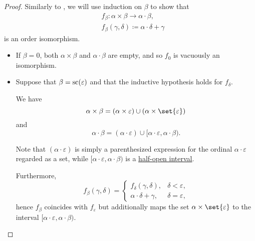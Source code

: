 \begin{proof}
  Similarly to , we will use induction on \( \beta \) to show that
  \begin{equation*}
    \begin{aligned}
      &f_\beta: \alpha \times \beta \to \alpha \cdot \beta, \\
      &f_\beta(\gamma, \delta) \coloneqq \alpha \cdot \delta + \gamma
    \end{aligned}
  \end{equation*}
  is an order isomorphism.

  \begin{itemize}
    \item If \( \beta = 0 \), both \( \alpha \times \beta \) and \( \alpha \cdot \beta \) are empty, and so \( f_0 \) is vacuously an isomorphism.

    \item Suppose that \( \beta = \op{sc}(\varepsilon) \) and that the inductive hypothesis holds for \( f_\delta \).

    We have
    \begin{equation*}
      \alpha \times \beta = (\alpha \times \varepsilon) \cup (\alpha \times \set{ \varepsilon })
    \end{equation*}
    and
    \begin{equation*}
      \alpha \cdot \beta = (\alpha \cdot \varepsilon) \cup [\alpha \cdot \varepsilon, \alpha \cdot \beta).
    \end{equation*}

    Note that \( (\alpha \cdot \varepsilon) \) is simply a parenthesized expression for the ordinal \( \alpha \cdot \varepsilon \) regarded as a set, while \( [\alpha \cdot \varepsilon, \alpha \cdot \beta) \) is a \hyperref[def:order_interval/half_open]{half-open interval}.

    Furthermore,
    \begin{equation*}
      f_\beta(\gamma, \delta) = \begin{cases}
        f_\delta(\gamma, \delta),     &\delta < \varepsilon, \\
        \alpha \cdot \delta + \gamma, &\delta = \varepsilon,
      \end{cases}
    \end{equation*}
    hence \( f_\beta \) coincides with \( f_\varepsilon \) but additionally maps the set \( \alpha \times \set{ \varepsilon } \) to the interval \( [\alpha \cdot \varepsilon, \alpha \cdot \beta) \).


\end{itemize}
\end{proof}
